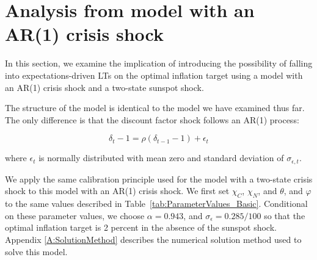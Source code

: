 \documentclass[11pt]{article}
\begin{document}
	\section{Analysis from model with an AR(1) crisis shock}
	\label{S:AR1Model}

    In this section, we examine the implication of introducing the possibility of falling into expectations-driven LTs on the optimal inflation target using a model with an AR(1) crisis shock and a two-state sunspot shock.

    The structure of the model is identical to the model we have examined thus far. The only difference is that the discount factor shock follows an AR(1) process:

    \begin{equation}
	\delta_{t}-1 = \rho (\delta_{t-1}-1)+\epsilon_{t}
    \end{equation}

    \noindent where $\epsilon_{t}$ is normally distributed with mean zero and standard deviation of $\sigma_{\epsilon,t}$.

    We apply the same calibration principle used for the model with a two-state crisis shock to this model with an AR(1) crisis shock. We first set $\chi_{C}$, $\chi_{N}$, and $\theta$, and $\varphi$ to the same values described in Table~\ref{tab:ParameterValues_Basic}. Conditional on these parameter values, we choose $\alpha = 0.943$, and $\sigma_{\epsilon} = 0.285/100$ so that the optimal inflation target is 2 percent in the absence of the sunspot shock. Appendix \ref{A:SolutionMethod} describes the numerical solution method used to solve this model.
\end{document}
